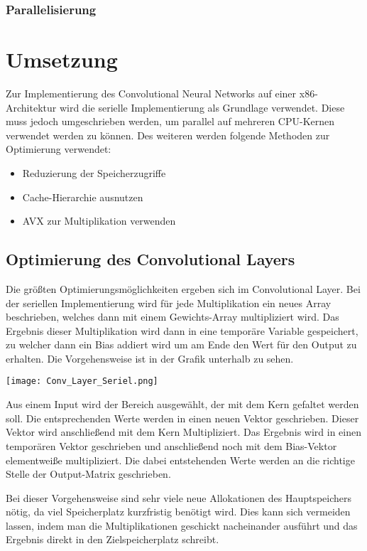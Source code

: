 \documentclass[../main.tex]{subfiles}
\begin{document}
\subsubsection{Parallelisierung}


\section{Umsetzung}

Zur Implementierung des Convolutional Neural Networks auf einer x86-Architektur wird die serielle Implementierung als Grundlage verwendet. Diese muss jedoch umgeschrieben werden, um parallel auf mehreren CPU-Kernen verwendet werden zu können. Des weiteren werden folgende Methoden zur Optimierung verwendet:
\begin{itemize}
	\item Reduzierung der Speicherzugriffe
	\item Cache-Hierarchie ausnutzen
	\item AVX zur Multiplikation verwenden
\end{itemize}

\subsection{Optimierung des Convolutional Layers}

Die größten Optimierungsmöglichkeiten ergeben sich im Convolutional Layer. Bei der seriellen Implementierung wird für jede Multiplikation ein neues Array beschrieben, welches dann mit einem Gewichts-Array multipliziert wird. Das Ergebnis dieser Multiplikation wird dann in eine temporäre Variable gespeichert, zu welcher dann ein Bias addiert wird um am Ende den Wert für den Output zu erhalten. Die Vorgehensweise ist in der Grafik unterhalb zu sehen.

\texttt{[image: Conv\_Layer\_Seriel.png]} %

Aus einem Input wird der Bereich ausgewählt, der mit dem Kern gefaltet werden soll. Die entsprechenden Werte werden in einen neuen Vektor geschrieben. Dieser Vektor wird anschließend mit dem Kern Multipliziert. Das Ergebnis wird in einen temporären Vektor geschrieben und anschließend noch mit dem Bias-Vektor elementweiße multipliziert. Die dabei entstehenden Werte werden an die richtige Stelle der Output-Matrix geschrieben.

Bei dieser Vorgehensweise sind sehr viele neue Allokationen des Hauptspeichers nötig, da viel Speicherplatz kurzfristig benötigt wird. Dies kann sich vermeiden lassen, indem man die Multiplikationen geschickt nacheinander ausführt und das Ergebnis direkt in den Zielspeicherplatz schreibt. 
\end{document}
